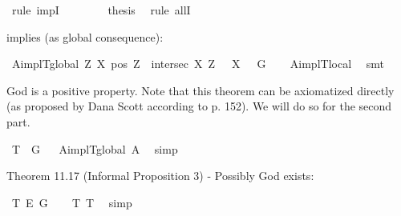 \begin{isabellebody}
\ {\isacharparenleft}rule\ impI{\isacharparenright}\isanewline
\ \ \isacommand{{\isacharbraceright}}\isamarkupfalse%
\ \isanewline
\ \ \isamarkupfalse%
\ {\isacharquery}thesis\ \isamarkupfalse%
\ {\isacharparenleft}rule\ allI{\isacharparenright}\isanewline
{}\isamarkupfalse%
%
\endisatagproof
{\isafoldproof}%
%
\isadelimproof
%
\endisadelimproof
%
\begin{isamarkuptext}%
 implies  (as global consequence):%
\end{isamarkuptext}\isamarkuptrue%
\isamarkupfalse%
\ A{}implT{}{\isacharunderscore}global{\isacharcolon}\ {\isachardoublequoteopen}{\isasymlfloor}\isactrlbold {\isasymforall}Z\ X{\isachardot}\ {\isacharparenleft}pos\ Z\ \isactrlbold {\isasymand}\ intersec\ X\ Z{\isacharparenright}\ \isactrlbold {\isasymrightarrow}\ {\isasymP}\ X{\isasymrfloor}\ {\isasymlongrightarrow}\ {\isasymlfloor}{\isasymP}\ G{\isasymrfloor}{\isachardoublequoteclose}\isanewline
%
\isadelimproof
\ \ %
\endisadelimproof
%
\isatagproof
{}\isamarkupfalse%
\ A{}implT{}{\isacharunderscore}local\ \isamarkupfalse%
\ smt%
\endisatagproof
{\isafoldproof}%
%
\isadelimproof
%
\endisadelimproof
%
\begin{isamarkuptext}%
God is a positive property. Note that this theorem can be axiomatized directly 
 (as proposed by Dana Scott according to \cite{fitting_book} p. 152). We will do so for the second part.%
\end{isamarkuptext}\isamarkuptrue%
\isamarkupfalse%
\ T{}{\isacharcolon}\ {\isachardoublequoteopen}{\isasymlfloor}{\isasymP}\ G{\isasymrfloor}{\isachardoublequoteclose}%
\isadelimproof
\ %
\endisadelimproof
%
\isatagproof
{}\isamarkupfalse%
\ A{}implT{}{\isacharunderscore}global\ A{}\ \isamarkupfalse%
\ simp%
\endisatagproof
{\isafoldproof}%
%
\isadelimproof
%
\endisadelimproof
%
\begin{isamarkuptext}%
Theorem 11.17 (Informal Proposition 3) - Possibly God exists:%
\end{isamarkuptext}\isamarkuptrue%
\isamarkupfalse%
\ T{}{\isacharcolon}\ {\isachardoublequoteopen}{\isasymlfloor}\isactrlbold {\isasymdiamond}\isactrlbold {\isasymexists}\isactrlsup E\ G{\isasymrfloor}{\isachardoublequoteclose}%
\isadelimproof
\ \ %
\endisadelimproof
%
\isatagproof
{}\isamarkupfalse%
\ T{}\ T{}\ \isamarkupfalse%
\ simp\isanewline
%
\endisatagproof
{\isafoldproof}%
%
\isadelimproof
%
\endisadelimproof
%
\isadelimtheory
%
\endisadelimtheory
%
\isatagtheory
%
\endisatagtheory
{\isafoldtheory}%
%
\isadelimtheory
%
\endisadelimtheory
%
\end{isabellebody}%
